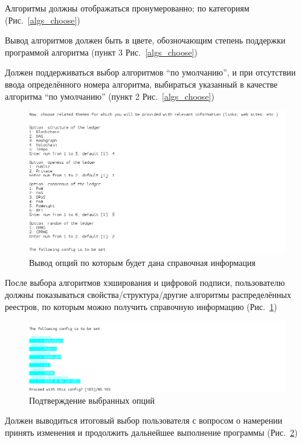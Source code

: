 Алгоритмы должны отображаться пронумерованно; по категориям (Рис.~\ref{algs_choose})

Вывод алгоритмов должен быть в цвете, обозночающим степень поддержки программой
алгоритма (пункт 3 Рис.~\ref{algs_choose})

Должен поддерживаться выбор алгоритмов ``по умолчанию'', и при отсутствии ввода
определённого номера алгоритма, выбираться указанный в качестве алгоритма ``по
умолчанию'' (пункт 2 Рис.~\ref{algs_choose})

\begin{figure}[h!]
    \centering
    \includegraphics[width=\textwidth]{./screenshots/additional_opts}
    \caption{Вывод опций по которым будет дана справочная информация}\label{additional_opts}
\end{figure}

После выбора алгоритмов хэширования и цифровой подписи, пользователю должны
показываться свойства/структура/другие алгоритмы распределённых реестров, по
которым можно получить справочную информацию (Рис.~\ref{additional_opts})

\begin{figure}[h!]
    \centering
    \includegraphics[width=\textwidth]{./screenshots/confirmation}
    \caption{Подтверждение выбранных опций}\label{confirmation}
\end{figure}

Должен выводиться итоговый выбор пользователя с вопросом о намерении принять
изменения и продолжить дальнейшее выполнение программы
(Рис.~\ref{confirmation})

